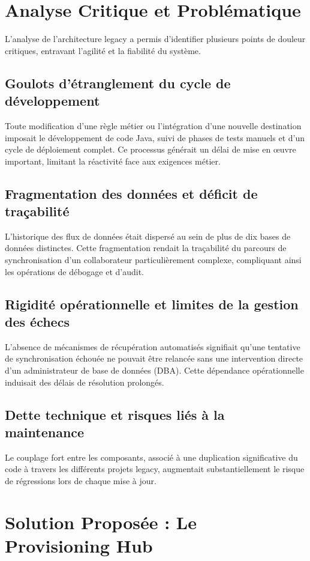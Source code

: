 \section{Analyse Critique et Problématique}
\label{sec:problematique}

L'analyse de l'architecture legacy a permis d'identifier plusieurs points de douleur critiques, entravant l'agilité et la fiabilité du système.

\subsection{Goulots d'étranglement du cycle de développement}
Toute modification d'une règle métier ou l'intégration d'une nouvelle destination imposait le développement de code Java, suivi de phases de tests manuels et d'un cycle de déploiement complet. Ce processus générait un délai de mise en œuvre important, limitant la réactivité face aux exigences métier.

\subsection{Fragmentation des données et déficit de traçabilité}
L'historique des flux de données était dispersé au sein de plus de dix bases de données distinctes. Cette fragmentation rendait la traçabilité du parcours de synchronisation d'un collaborateur particulièrement complexe, compliquant ainsi les opérations de débogage et d'audit.

\subsection{Rigidité opérationnelle et limites de la gestion des échecs}
L'absence de mécanismes de récupération automatisés signifiait qu'une tentative de synchronisation échouée ne pouvait être relancée sans une intervention directe d'un administrateur de base de données (DBA). Cette dépendance opérationnelle induisait des délais de résolution prolongés.

\subsection{Dette technique et risques liés à la maintenance}
Le couplage fort entre les composants, associé à une duplication significative du code à travers les différents projets legacy, augmentait substantiellement le risque de régressions lors de chaque mise à jour.

\section{Solution Proposée : Le Provisioning Hub}
\label{sec:solution}

